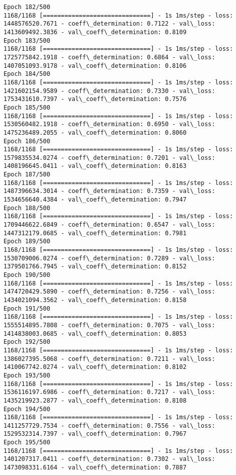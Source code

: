 \documentclass[11pt]{article}
\begin{document}
\begin{Verbatim}[commandchars=\\\{\}]
Epoch 182/500
1168/1168 [==============================] - 1s 1ms/step - loss: 1448576520.7671 - coeff\_determination: 0.7122 - val\_loss: 1413609492.3836 - val\_coeff\_determination: 0.8109
Epoch 183/500
1168/1168 [==============================] - 1s 1ms/step - loss: 1725775842.1918 - coeff\_determination: 0.6864 - val\_loss: 1407051093.9178 - val\_coeff\_determination: 0.8106
Epoch 184/500
1168/1168 [==============================] - 1s 1ms/step - loss: 1421602154.9589 - coeff\_determination: 0.7330 - val\_loss: 1753431610.7397 - val\_coeff\_determination: 0.7576
Epoch 185/500
1168/1168 [==============================] - 1s 1ms/step - loss: 1530560482.1918 - coeff\_determination: 0.6950 - val\_loss: 1475236489.2055 - val\_coeff\_determination: 0.8060
Epoch 186/500
1168/1168 [==============================] - 1s 1ms/step - loss: 1579835534.0274 - coeff\_determination: 0.7201 - val\_loss: 1408196645.0411 - val\_coeff\_determination: 0.8163
Epoch 187/500
1168/1168 [==============================] - 1s 1ms/step - loss: 1487396634.3014 - coeff\_determination: 0.7359 - val\_loss: 1534656640.4384 - val\_coeff\_determination: 0.7947
Epoch 188/500
1168/1168 [==============================] - 1s 1ms/step - loss: 1709446622.6849 - coeff\_determination: 0.6547 - val\_loss: 1447312179.0685 - val\_coeff\_determination: 0.7981
Epoch 189/500
1168/1168 [==============================] - 1s 1ms/step - loss: 1530709006.0274 - coeff\_determination: 0.7289 - val\_loss: 1379501766.7945 - val\_coeff\_determination: 0.8152
Epoch 190/500
1168/1168 [==============================] - 1s 1ms/step - loss: 1474720429.5890 - coeff\_determination: 0.7256 - val\_loss: 1434021094.3562 - val\_coeff\_determination: 0.8158
Epoch 191/500
1168/1168 [==============================] - 1s 1ms/step - loss: 1555514895.7808 - coeff\_determination: 0.7075 - val\_loss: 1414838003.0685 - val\_coeff\_determination: 0.8053
Epoch 192/500
1168/1168 [==============================] - 1s 1ms/step - loss: 1386027395.5068 - coeff\_determination: 0.7211 - val\_loss: 1410067742.0274 - val\_coeff\_determination: 0.8102
Epoch 193/500
1168/1168 [==============================] - 1s 1ms/step - loss: 1536116197.6986 - coeff\_determination: 0.7217 - val\_loss: 1435219923.2877 - val\_coeff\_determination: 0.8108
Epoch 194/500
1168/1168 [==============================] - 1s 1ms/step - loss: 1411257729.7534 - coeff\_determination: 0.7556 - val\_loss: 1529532314.7397 - val\_coeff\_determination: 0.7967
Epoch 195/500
1168/1168 [==============================] - 1s 1ms/step - loss: 1401207317.0411 - coeff\_determination: 0.7302 - val\_loss: 1473098331.6164 - val\_coeff\_determination: 0.7887

\end{Verbatim}
\end{document}
